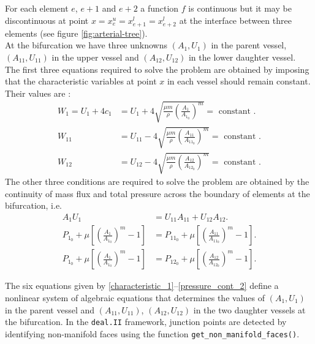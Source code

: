 \documentclass[11pt]{article}
\begin{document}
For each element $e$, $e+1$ and $e+2$ a function $f$ is continuous but it may be discontinuous at point $x= x_e^u = x^l_{e+1} = x^{l}_{e+2}$ at the interface between three elements (see figure \ref{fig:arterial-tree}). \\
At the bifurcation we have three unknowns $(A_1, U_1)$ in the parent vessel, $(A_{11}, U_{11})$ in the upper vessel and $(A_{12}, U_{12})$ in the lower daughter vessel. \\
The first three equations required to solve the problem are obtained by imposing that the characteristic variables at point $x$ in each vessel should remain constant. Their values are : 
\begin{align}
    W_1 = U_1 + 4 c_1 &= U_1 + 4 \sqrt{\frac{\mu m}{\rho} \left(\frac{A_1}{A_{1_0}} \right)^m} = \text{ constant }. \label{characteristic_1} \\ 
    W_{11} &= U_{11} -  4 \sqrt{\frac{\mu m}{\rho} \left(\frac{A_{11}}{A_{11_0}} \right)^m}= \text{ constant }. \label{characteristic_2} \\ 
    W_{12} &= U_{12} -  4 \sqrt{\frac{\mu m}{\rho} \left(\frac{A_{12}}{A_{12_0}} \right)^m} = \text{ constant }.  \label{characteristic_3}
\end{align}
The other three conditions are required to solve the problem are obtained by the continuity of mass flux and total pressure across the boundary of elements at the bifurcation, i.e. 
\begin{align}
    A_1 U_1 &= U_{11}A_{11} + U_{12}A_{12}. \label{mass_equation}\\
    P_{1_{0}} + \mu \left[ \left( \frac{A_1}{A_{{1}_0}}\right)^m - 1 \right] &= P_{11_{0}} + \mu \left[ \left( \frac{A_{11}}{A_{{11}_0}}\right)^m - 1 \right] . \label{pressure_cont_1} \\
    P_{1_{0}} + \mu \left[ \left( \frac{A_1}{A_{{1}_0}}\right)^m - 1 \right] &= P_{12_{0}} + \mu \left[ \left( \frac{A_{12}}{A_{{12}_0}}\right)^m - 1 \right] . \label{pressure_cont_2}
\end{align}

The six equations given by \ref{characteristic_1}--\ref{pressure_cont_2} define a nonlinear system of algebraic equations that determines the values of $(A_1,U_1)$ in the parent vessel and $(A_{11},U_{11})$, $(A_{12},U_{12})$ in the two daughter vessels at the bifurcation. In the \texttt{deal.II} framework, junction points are detected by identifying non-manifold faces using the function \texttt{get\_non\_manifold\_faces()}.
\end{document}
